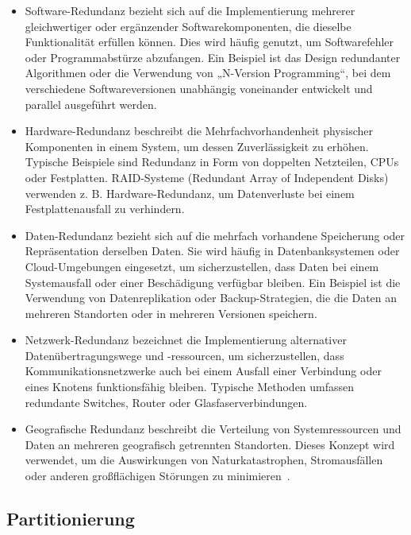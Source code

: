 \begin{itemize}
    \item Software-Redundanz bezieht sich auf die Implementierung mehrerer gleichwertiger oder ergänzender
Softwarekomponenten, die dieselbe Funktionalität erfüllen können.
Dies wird häufig genutzt, um Softwarefehler oder Programmabstürze abzufangen.
Ein Beispiel ist das Design redundanter Algorithmen oder die Verwendung von „N-Version Programming“,
bei dem verschiedene Softwareversionen unabhängig voneinander entwickelt und parallel ausgeführt werden.
    \item Hardware-Redundanz beschreibt die Mehrfachvorhandenheit physischer Komponenten in einem System,
um dessen Zuverlässigkeit zu erhöhen.
Typische Beispiele sind Redundanz in Form von doppelten Netzteilen, CPUs oder Festplatten.
RAID-Systeme (Redundant Array of Independent Disks) verwenden z. B. Hardware-Redundanz, um Datenverluste bei einem
Festplattenausfall zu verhindern.
    \item Daten-Redundanz bezieht sich auf die mehrfach vorhandene Speicherung oder Repräsentation derselben Daten.
Sie wird häufig in Datenbanksystemen oder Cloud-Umgebungen eingesetzt, um sicherzustellen, dass Daten bei einem
Systemausfall oder einer Beschädigung verfügbar bleiben.
Ein Beispiel ist die Verwendung von Datenreplikation oder Backup-Strategien, die die Daten an mehreren Standorten oder
in mehreren Versionen speichern.
    \item Netzwerk-Redundanz bezeichnet die Implementierung alternativer Datenübertragungswege und -ressourcen,
um sicherzustellen, dass Kommunikationsnetzwerke auch bei einem Ausfall einer Verbindung oder eines Knotens
funktionsfähig bleiben.
Typische Methoden umfassen redundante Switches, Router oder Glasfaserverbindungen.
    \item Geografische Redundanz beschreibt die Verteilung von Systemressourcen und Daten an mehreren geografisch
getrennten Standorten.
Dieses Konzept wird verwendet, um die Auswirkungen von Naturkatastrophen, Stromausfällen oder anderen großflächigen
Störungen zu minimieren~\cite{g4g-redundancy}.

\end{itemize}


\subsection{Partitionierung}

